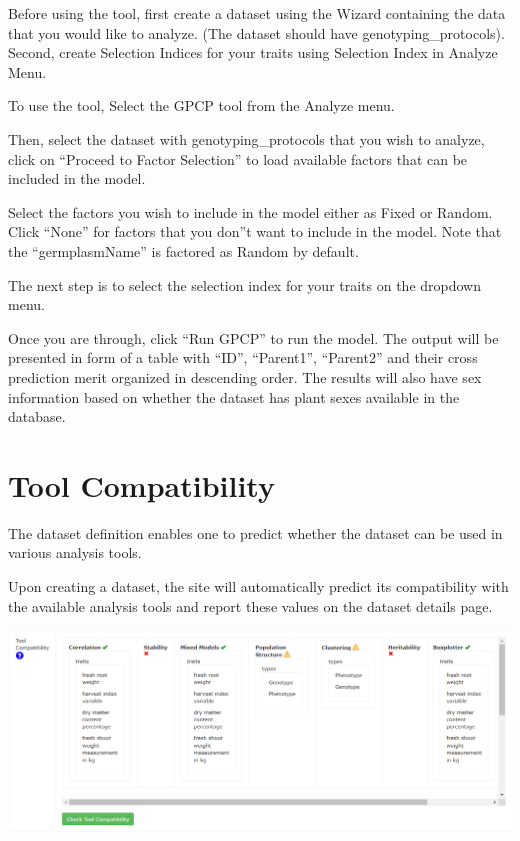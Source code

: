 \documentclass[
  12pt,
]{book}
\begin{document}
Before using the tool, first create a dataset using the Wizard containing the data that you would like to analyze. (The dataset should have genotyping\_protocols). Second, create Selection Indices for your traits using Selection Index in Analyze Menu.

To use the tool, Select the GPCP tool from the Analyze menu.

Then, select the dataset with genotyping\_protocols that you wish to analyze, click on ``Proceed to Factor Selection'' to load available factors that can be included in the model.

Select the factors you wish to include in the model either as Fixed or Random. Click ``None'' for factors that you don''t want to include in the model. Note that the ``germplasmName'' is factored as Random by default.

The next step is to select the selection index for your traits on the dropdown menu.

Once you are through, click ``Run GPCP'' to run the model. The output will be presented in form of a table with ``ID'', ``Parent1'', ``Parent2'' and their cross prediction merit organized in descending order. The results will also have sex information based on whether the dataset has plant sexes available in the database.

\hypertarget{tool-compatibility}{%
\section{Tool Compatibility}\label{tool-compatibility}}

The dataset definition enables one to predict whether the dataset can be used in various analysis tools.

Upon creating a dataset, the site will automatically predict its compatibility with the available analysis tools and report these values on the dataset details page.

\begin{center}\includegraphics[width=0.95\linewidth]{assets/images/tool_compatibility_details} \end{center}
\end{document}
